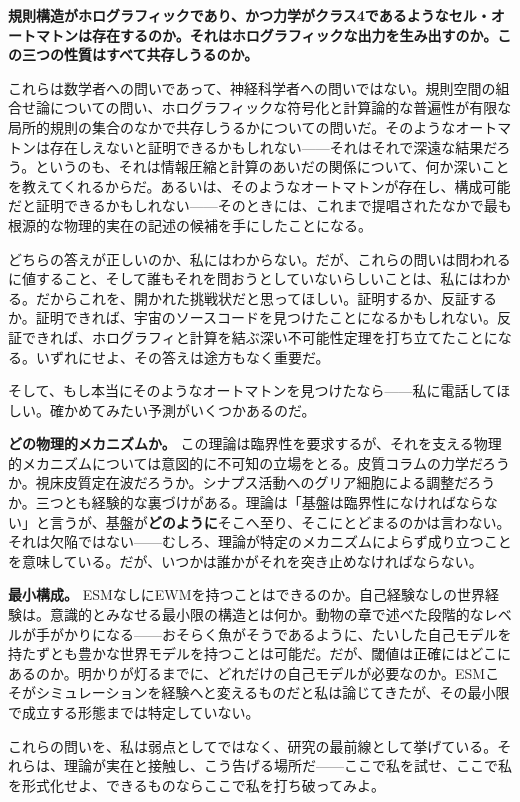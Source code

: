 \documentclass[11pt, twoside, openright]{book}
\begin{document}
\textbf{規則構造がホログラフィックであり、かつ力学がクラス4であるようなセル・オートマトンは存在するのか。それはホログラフィックな出力を生み出すのか。この三つの性質はすべて共存しうるのか。}

これらは数学者への問いであって、神経科学者への問いではない。規則空間の組合せ論についての問い、ホログラフィックな符号化と計算論的な普遍性が有限な局所的規則の集合のなかで共存しうるかについての問いだ。そのようなオートマトンは存在しえないと証明できるかもしれない------それはそれで深遠な結果だろう。というのも、それは情報圧縮と計算のあいだの関係について、何か深いことを教えてくれるからだ。あるいは、そのようなオートマトンが存在し、構成可能だと証明できるかもしれない------そのときには、これまで提唱されたなかで最も根源的な物理的実在の記述の候補を手にしたことになる。

どちらの答えが正しいのか、私にはわからない。だが、これらの問いは問われるに値すること、そして誰もそれを問おうとしていないらしいことは、私にはわかる。だからこれを、開かれた挑戦状だと思ってほしい。証明するか、反証するか。証明できれば、宇宙のソースコードを見つけたことになるかもしれない。反証できれば、ホログラフィと計算を結ぶ深い不可能性定理を打ち立てたことになる。いずれにせよ、その答えは途方もなく重要だ。

そして、もし本当にそのようなオートマトンを見つけたなら------私に電話してほしい。確かめてみたい予測がいくつかあるのだ。

\textbf{どの物理的メカニズムか。} この理論は臨界性を要求するが、それを支える物理的メカニズムについては意図的に不可知の立場をとる。皮質コラムの力学だろうか。視床皮質定在波だろうか。シナプス活動へのグリア細胞による調整だろうか。三つとも経験的な裏づけがある。理論は「基盤は臨界性になければならない」と言うが、基盤が\textbf{どのように}そこへ至り、そこにとどまるのかは言わない。それは欠陥ではない------むしろ、理論が特定のメカニズムによらず成り立つことを意味している。だが、いつかは誰かがそれを突き止めなければならない。

\textbf{最小構成。} ESMなしにEWMを持つことはできるのか。自己経験なしの世界経験は。意識的とみなせる最小限の構造とは何か。動物の章で述べた段階的なレベルが手がかりになる------おそらく魚がそうであるように、たいした自己モデルを持たずとも豊かな世界モデルを持つことは可能だ。だが、閾値は正確にはどこにあるのか。明かりが灯るまでに、どれだけの自己モデルが必要なのか。ESMこそがシミュレーションを経験へと変えるものだと私は論じてきたが、その最小限で成立する形態までは特定していない。

これらの問いを、私は弱点としてではなく、研究の最前線として挙げている。それらは、理論が実在と接触し、こう告げる場所だ------ここで私を試せ、ここで私を形式化せよ、できるものならここで私を打ち破ってみよ。
\end{document}
